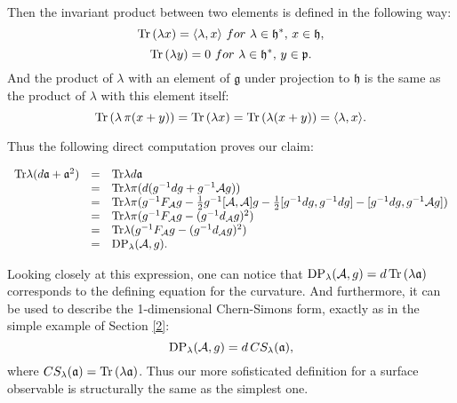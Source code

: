 \documentclass[11pt]{report}
\theoremstyle{plain}
\theoremstyle{definition}
\theoremstyle{remark}
\theoremstyle{remark}
\numberwithin{equation}{section}
\begin{document}
Then the invariant product between two elements is defined in the following way:
$$ {\rm Tr} \, (\lambda x) = \langle \lambda , x \rangle \, \, for \, \, \lambda \in \mathfrak{h}^*, \, x \in  \mathfrak{h},$$
$$ {\rm Tr} \, (\lambda y) = 0 \, \, for \, \, \lambda \in \mathfrak{h}^*, \, y \in  \mathfrak{p}.$$
And the product of $\lambda$ with an element of $\mathfrak{g}$ under projection to $\mathfrak{h}$ is the same as the product of $\lambda$ with this element itself:
$$ {\rm Tr} \,( \lambda \, \pi (x+y)) = {\rm Tr} \, (\lambda x)= {\rm Tr} \, (\lambda (x+y) )= \langle \lambda , x \rangle.$$

Thus the following direct computation proves our claim:
\begin{spacing}{1.45}
$\begin{array}{lll}
{\rm Tr} \lambda (d\mathfrak{a} + \mathfrak{a}^2) & = & {\rm Tr} \lambda d\mathfrak{a} \\
& =&  {\rm Tr} \lambda \pi(d(g^{-1} dg + g^{-1} \mathcal{A} g)) \\
& = & {\rm Tr} \lambda \pi (g^{-1} F_{\mathcal{A}} g - \frac{1}{2} g^{-1}[\mathcal{A},\mathcal{A}] g - \frac{1}{2} [g^{-1} dg , g^{-1} dg] - [g^{-1} dg , g^{-1} \mathcal{A}g]) \\
& = & {\rm Tr} \lambda \pi (g^{-1} F_{\mathcal{A}} g - (g^{-1} d_{\mathcal{A}} g)^2) \\
& =  & {\rm Tr} \lambda (g^{-1} F_{\mathcal{A}} g - (g^{-1} d_{\mathcal{A}} g)^2) \\
& =&  {\rm DP}_\lambda(\mathcal{A},g).
\end{array}$
\end{spacing} 
Looking closely at this expression, one can notice that $ {\rm DP}_\lambda(\mathcal{A},g) = d \, {\rm Tr} \, (\lambda \mathfrak{a})$ corresponds to the defining equation for the curvature. And furthermore, it can be used to describe the 1-dimensional Chern-Simons form, exactly as in the simple example of Section \ref{2}:
$$   {\rm DP}_\lambda(\mathcal{A},g) = d \, CS_\lambda (\mathfrak{a}),$$
where $CS_\lambda (\mathfrak{a})= {\rm Tr} \, (\lambda \mathfrak{a})$.
Thus our more sofisticated definition for a surface observable is structurally the same as the simplest one. 



\end{document}
